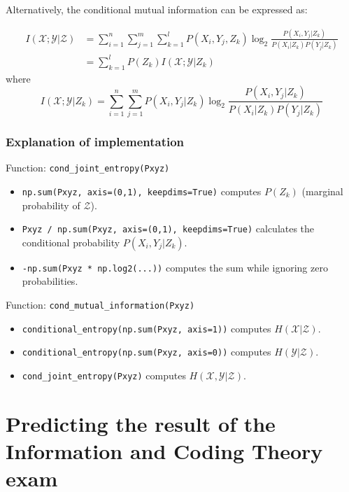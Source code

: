 \documentclass{article}
\begin{document}
Alternatively, the conditional mutual information can be expressed as:

\begin{align}
I(\mathcal{X};\mathcal{Y} | \mathcal{Z}) &= \sum_{i=1}^{n} \sum_{j=1}^{m} \sum_{k=1}^{l} P(X_i, Y_j, Z_k) \log_2 \frac{P(X_i, Y_j | Z_k)}{P(X_i | Z_k) P(Y_j | Z_k)} \\
&= \sum_{k=1}^{l}  P(Z_k)   I(\mathcal{X}; \mathcal{Y} | Z_k) 
\end{align}
where
\begin{equation}
I(\mathcal{X}; \mathcal{Y} | Z_k) = \sum_{i=1}^{n} \sum_{j=1}^{m}  P(X_i, Y_j|Z_k) \log_2 \frac{P(X_i, Y_j | Z_k)}{P(X_i | Z_k) P(Y_j | Z_k)}
\end{equation}

\subsubsection*{Explanation of implementation}

Function: \texttt{cond\_joint\_entropy(Pxyz)}
\begin{itemize}
    \item \texttt{np.sum(Pxyz, axis=(0,1), keepdims=True)} computes $P(Z_k)$ (marginal probability of $\mathcal{Z}$).
    \item \texttt{Pxyz / np.sum(Pxyz, axis=(0,1), keepdims=True)} calculates the conditional probability $P(X_i, Y_j | Z_k)$.
    \item \texttt{-np.sum(Pxyz * np.log2(...))} computes the sum while ignoring zero probabilities.
\end{itemize}

Function: \texttt{cond\_mutual\_information(Pxyz)}
\begin{itemize}
    \item \texttt{conditional\_entropy(np.sum(Pxyz, axis=1))} computes $H(\mathcal{X} | \mathcal{Z})$.
    \item \texttt{conditional\_entropy(np.sum(Pxyz, axis=0))} computes $H(\mathcal{Y} | \mathcal{Z})$.
    \item \texttt{cond\_joint\_entropy(Pxyz)} computes $H(\mathcal{X}, \mathcal{Y} | \mathcal{Z})$.
\end{itemize}


\section{Predicting the result of the Information and Coding Theory exam}
\end{document}
